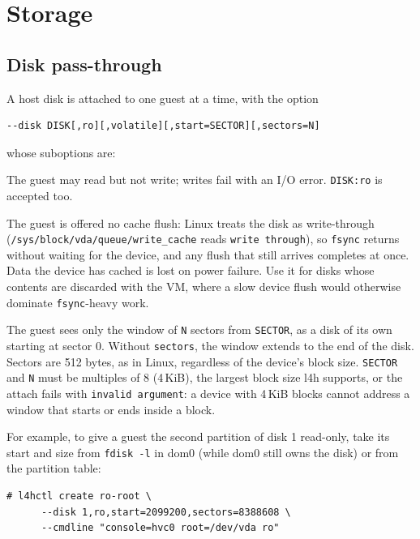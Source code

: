 \documentclass[11pt,a4paper]{report}
\newcommand{\cmd}[1]{\texttt{#1}}
\newcommand{\file}[1]{\texttt{#1}}
\begin{document}
\chapter{Storage}
\label{ch:storage}

\section{Disk pass-through}

A host disk is attached to one guest at a time, with the option
\begin{lstlisting}
--disk DISK[,ro][,volatile][,start=SECTOR][,sectors=N]
\end{lstlisting}
whose suboptions are:

\begin{description}[style=nextline]
  \item[\texttt{ro}] The guest may read but not write; writes fail with an
    I/O error. \texttt{DISK:ro} is accepted too.
  \item[\texttt{volatile}] The guest is offered no cache flush: Linux
    treats the disk as write-through (\file{/sys/block/vda/queue/write\_cache}
    reads \texttt{write through}), so \texttt{fsync} returns without
    waiting for the device, and any flush that still arrives completes at
    once. Data the device has cached is lost on power failure. Use it for
    disks whose contents are discarded with the VM, where a slow device
    flush would otherwise dominate \texttt{fsync}-heavy work.
  \item[\texttt{start=SECTOR}, \texttt{sectors=N}] The guest sees only the
    window of \texttt{N} sectors from \texttt{SECTOR}, as a disk of its own
    starting at sector 0. Without \texttt{sectors}, the window extends to the
    end of the disk. Sectors are 512 bytes, as in Linux, regardless of the
    device's block size. \texttt{SECTOR} and \texttt{N} must be multiples
    of 8 (4\,KiB), the largest block size l4h supports, or the attach fails
    with \texttt{invalid argument}: a device with 4\,KiB blocks cannot
    address a window that starts or ends inside a block.
\end{description}

For example, to give a guest the second partition of disk 1 read-only, take
its start and size from \cmd{fdisk -l} in dom0 (while dom0 still owns the
disk) or from the partition table:
\begin{lstlisting}
# l4hctl create ro-root \
      --disk 1,ro,start=2099200,sectors=8388608 \
      --cmdline "console=hvc0 root=/dev/vda ro"
\end{lstlisting}
\end{document}
